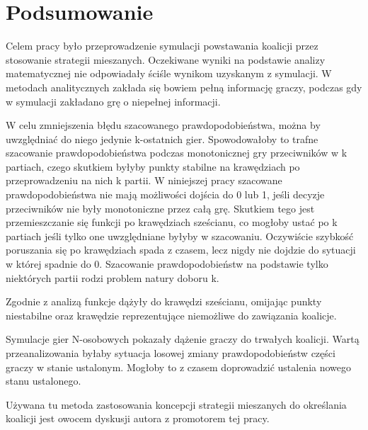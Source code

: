 \chapter{Podsumowanie}
\label{cha:podsumowanie}

Celem pracy było przeprowadzenie symulacji  powstawania koalicji przez stosowanie strategii mieszanych. Oczekiwane wyniki na podstawie analizy matematycznej nie odpowiadały ściśle wynikom uzyskanym z symulacji. W metodach analitycznych zakłada się bowiem pełną informację graczy, podczas gdy w symulacji zakładano grę o niepełnej informacji. 

W celu zmniejszenia błędu szacowanego prawdopodobieństwa, można by uwzględniać do niego jedynie k-ostatnich gier. Spowodowałoby to trafne szacowanie prawdopodobieństwa podczas monotonicznej gry przeciwników w k partiach, czego skutkiem byłyby punkty stabilne na krawędziach po przeprowadzeniu na nich k partii. W niniejszej pracy szacowane prawdopodobieństwa nie mają możliwości dojścia do 0 lub 1, jeśli decyzje przeciwników nie były monotoniczne przez całą grę. Skutkiem tego jest przemieszczanie się funkcji po krawędziach sześcianu, co mogłoby ustać po k partiach jeśli tylko one uwzględniane byłyby w szacowaniu. Oczywiście szybkość poruszania się po krawędziach spada z czasem, lecz nigdy nie dojdzie do sytuacji w której spadnie do 0. Szacowanie prawdopodobieństw na podstawie tylko niektórych partii rodzi problem natury doboru k. 

Zgodnie z analizą funkcje dążyły do krawędzi sześcianu, omijając punkty niestabilne oraz krawędzie reprezentujące niemożliwe do zawiązania koalicje.

Symulacje gier N-osobowych pokazały dążenie graczy do trwałych koalicji. Wartą przeanalizowania byłaby sytuacja losowej zmiany prawdopodobieństw części graczy w stanie ustalonym. Mogłoby to z czasem doprowadzić ustalenia nowego stanu ustalonego.

Używana tu metoda zastosowania koncepcji strategii mieszanych do określania koalicji jest owocem dyskusji autora z promotorem tej pracy.
